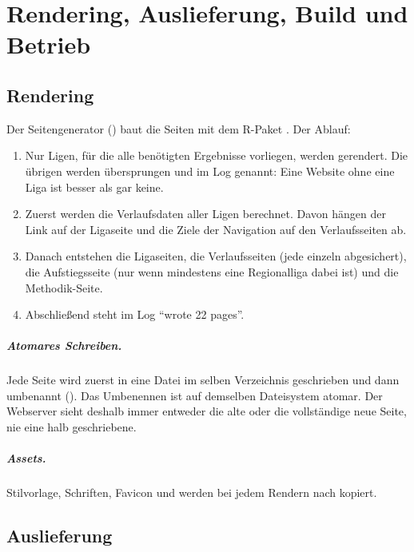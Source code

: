 \chapter{Rendering, Auslieferung, Build und Betrieb}\label{kap:betrieb}

\section{Rendering}

Der Seitengenerator () baut die Seiten
mit dem R-Paket . Der Ablauf:

\begin{enumerate}
  \item Nur Ligen, für die alle benötigten Ergebnisse vorliegen, werden
        gerendert. Die übrigen werden übersprungen und im Log genannt: Eine
        Website ohne eine Liga ist besser als gar keine.
  \item Zuerst werden die Verlaufsdaten aller Ligen berechnet. Davon hängen
        der Link auf der Ligaseite und die Ziele der Navigation auf den
        Verlaufsseiten ab.
  \item Danach entstehen die Ligaseiten, die Verlaufsseiten (jede einzeln
        abgesichert), die Aufstiegsseite (nur wenn mindestens eine
        Regionalliga dabei ist) und die Methodik-Seite.
  \item Abschließend steht im Log \enquote{wrote 22 pages}.
\end{enumerate}

\paragraph{Atomares Schreiben.} Jede Seite wird zuerst in eine Datei
 im selben Verzeichnis geschrieben und dann umbenannt
(). Das Umbenennen ist auf demselben
Dateisystem atomar. Der Webserver sieht deshalb immer entweder die alte oder
die vollständige neue Seite, nie eine halb geschriebene.

\paragraph{Assets.} Stilvorlage, Schriften, Favicon und 
werden bei jedem Rendern nach  kopiert.

\section{Auslieferung}

